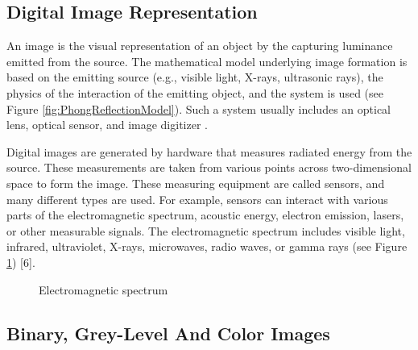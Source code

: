 \subsection{Digital Image Representation}

An image is the visual representation of an object by the capturing luminance emitted from the source. The mathematical model underlying image formation is based on the emitting source (e.g., visible light, X-rays, ultrasonic rays), the physics of the interaction of the emitting object, and the system is used (see Figure \ref{fig:PhongReflectionModel}). Such a system usually includes an optical lens, optical sensor, and image digitizer \cite{pitas2000digital}.

Digital images are generated by hardware that measures radiated energy from the source. These measurements are taken from various points across two-dimensional space to form the image. These measuring equipment are called sensors, and many different types are used. For example, sensors can interact with various parts of the electromagnetic spectrum, acoustic energy, electron emission, lasers, or other measurable signals. The electromagnetic spectrum includes visible light, infrared, ultraviolet, X-rays, microwaves, radio waves, or gamma rays (see Figure \ref{fig:EMSpectrumcolor}) [6].

\begin{figure}[htbp]
\centering
{}
\caption{Electromagnetic spectrum \cite{ElectromagneticSpectrum}}
\label{fig:EMSpectrumcolor}
\end{figure}

\subsection{Binary, Grey-Level And Color Images}

